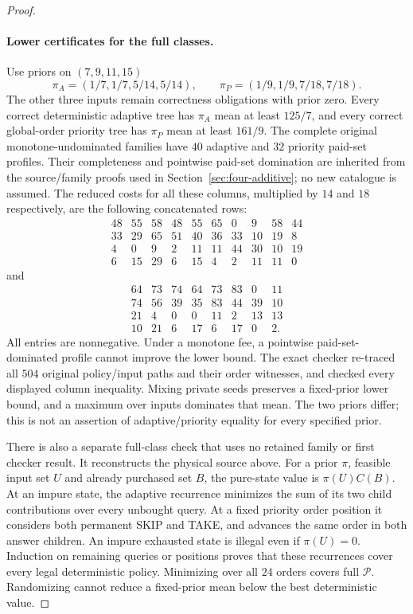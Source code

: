 \begin{proof}
\paragraph*{Lower certificates for the full classes.}
Use priors on $(7,9,11,15)$
\[
 \pi_A=(1/7,1/7,5/14,5/14),\qquad
 \pi_P=(1/9,1/9,7/18,7/18).
\]
The other three inputs remain correctness obligations with prior zero.
Every correct deterministic adaptive tree has $\pi_A$ mean at least
$125/7$, and every correct global-order priority tree has $\pi_P$ mean
at least $161/9$. The complete original monotone-undominated families
have $40$ adaptive and $32$ priority paid-set profiles. Their completeness
and pointwise paid-set domination are inherited from the source/family
proofs used in Section~\ref{sec:four-additive}; no new catalogue is assumed.
The reduced costs for all these columns, multiplied by $14$ and $18$
respectively, are the following concatenated rows:
\[
\begin{array}{rrrrrrrrrr}
48&55&58&48&55&65&0&9&58&44\\
33&29&65&51&40&36&33&10&19&8\\
4&0&9&2&11&11&44&30&10&19\\
6&15&29&6&15&4&2&11&11&0
\end{array}
\]
and
\[
\begin{array}{rrrrrrrr}
64&73&74&64&73&83&0&11\\
74&56&39&35&83&44&39&10\\
21&4&0&0&11&2&13&13\\
10&21&6&17&6&17&0&2.
\end{array}
\]
All entries are nonnegative. Under a monotone fee, a pointwise
paid-set-dominated profile cannot improve the lower bound. The exact
checker re-traced all $504$ original policy/input paths and their order
witnesses, and checked every displayed column inequality. Mixing private
seeds preserves a fixed-prior lower bound, and a maximum over inputs
dominates that mean. The two priors differ; this is not an assertion
of adaptive/priority equality for every specified prior.

There is also a separate full-class check that uses no retained family
or first checker result. It reconstructs the physical source above.
For a prior $\pi$, feasible input set $U$ and already purchased set $B$,
the pure-state value is $\pi(U)C(B)$. At an impure state, the adaptive
recurrence minimizes the sum of its two child contributions over every
unbought query. At a fixed priority order position it considers both
permanent SKIP and TAKE, and advances the same order in both answer
children. An impure exhausted state is illegal even if $\pi(U)=0$.
Induction on remaining queries or positions proves that these recurrences
cover every legal deterministic policy. Minimizing over all $24$ orders
covers full $\mathcal P$. Randomizing cannot reduce a fixed-prior mean
below the best deterministic value.


\end{proof}
